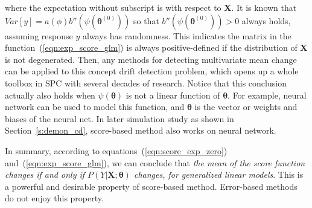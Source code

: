 \documentclass[twoside,11pt]{article}
\begin{document}
where the expectation without subscript is with respect to $\bm {X}$. It is known that $Var[y] = a ( \phi)b''(\psi ( \bm { \theta} ^{ (0)}))$ so that $b''(\psi ( \bm { \theta} ^{ (0)}))>0$ always holds, assuming response $y$ always has randomness. This indicates the matrix in the function~(\ref{eqn:exp_score_glm}) is always positive-defined if the distribution of $\bm {X}$ is not degenerated. Then, any methods for detecting multivariate mean change can be applied to this concept drift detection problem, which opens up a whole toolbox in SPC with several decades of research. Notice that this conclusion actually also holds when $ \psi ( \bm { \theta})$ is not a linear function of $\bm { \theta}$. For example, neural network can be used to model this function, and $\bm { \theta}$ is the vector or weights and biases of the neural net. In later simulation study as shown in Section~\ref{s:demon_cd}, score-based method also works on neural network. 

In summary, according to equations~(\ref{eqn:score_exp_zero}) and~(\ref{eqn:exp_score_glm}), we can conclude that \textit{the mean of the score function changes if and only if $P(Y|\bm{X};\bm{\theta})$ changes, for generalized linear models}. This is a powerful and desirable property of score-based method. Error-based methods do not enjoy this property. 
\end{document}
